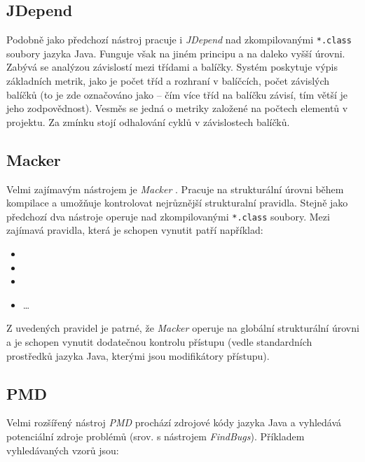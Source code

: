 \subsection{JDepend}
Podobně jako předchozí nástroj pracuje i \emph{JDepend} \cite{existingtools:jdepend} nad zkompilovanými \verb+*.class+ soubory jazyka Java. Funguje však na jiném principu a na daleko vyšší úrovni. Zabývá se analýzou závislostí mezi třídami a balíčky. Systém poskytuje výpis základních metrik, jako je počet tříd a rozhraní v balíčcích, počet závislých balíčků (to je zde označováno jako  -- čím více tříd na balíčku závisí, tím větší je jeho zodpovědnost). Vesměs se jedná o metriky založené na počtech elementů v projektu. Za zmínku stojí odhalování cyklů v závislostech balíčků.

\subsection{Macker}
Velmi zajímavým nástrojem je \emph{Macker} \cite{existingtools:macker}. Pracuje na strukturální úrovni během kompilace a umožňuje kontrolovat nejrůznější strukturalní pravidla. Stejně jako předchozí dva nástroje operuje nad zkompilovanými \verb+*.class+ soubory. Mezi zajímavá pravidla, která je schopen vynutit patří například:

\begin{itemize}
\item {}
\item {}
\item {}
\item \ldots
\end{itemize}

Z uvedených pravidel je patrné, že \emph{Macker} operuje na globální strukturální úrovni a je schopen vynutit dodatečnou kontrolu přístupu (vedle standardních prostředků jazyka Java, kterými jsou modifikátory přístupu).

\subsection{PMD}
Velmi rozšířený nástroj \emph{PMD} \cite{existingtools:pmd} prochází zdrojové kódy jazyka Java a vyhledává potenciální zdroje problémů (srov. s nástrojem \emph{FindBugs}). Příkladem vyhledávaných vzorů jsou:

